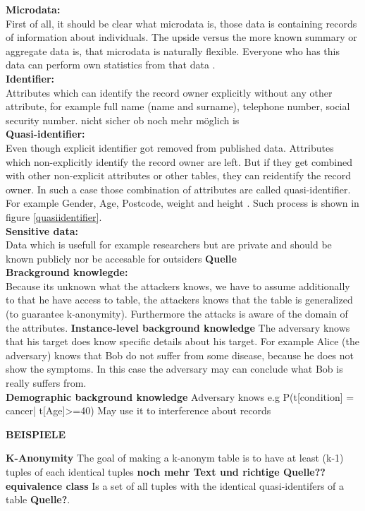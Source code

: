 \documentclass{llncs}
\begin{document}
\textbf{Microdata:}\\
First of all, it should be clear what microdata is, those data is containing records of information about individuals. The upside versus the more known summary or aggregate data is, that microdata is naturally flexible. Everyone who has this data can perform own statistics from that data \cite{microdataweb}.\\
\textbf{Identifier:}\\
Attributes which can identify the record owner explicitly without any other attribute, for example full name (name and surname), telephone number, social security number. nicht sicher ob noch mehr möglich is\cite{domingo2008critique}\\
\textbf{Quasi-identifier:}\\
Even though explicit identifier got removed from published data. Attributes which non-explicitly identify the record owner are left. But if they get combined with other non-explicit attributes or other tables, they can reidentify the record owner. In such a case those combination of attributes are called quasi-identifier. For example Gender, Age, Postcode, weight and height \cite{dalenius1986finding}. Such process is shown in figure \ref{quasiidentifier}.\\
\textbf{Sensitive data:}\\
Data which is usefull for example researchers but are private and should be known publicly nor be accesable for outsiders \textbf{Quelle}\\
\textbf{Brackground knowlegde:}\\
Because its unknown what the attackers knows, we have to assume additionally to that he have access to table, the attackers knows that the table is generalized (to guarantee k-anonymity). Furthermore the attacks is aware of the domain of the attributes. 
\textbf{Instance-level background knowledge}
The adversary knows that his target does know specific details about his target. For example Alice (the adversary) knows that Bob do not suffer from some disease, because he does not show the symptoms. In this case the adversary may can conclude what Bob is really suffers from.\\
\textbf{Demographic background knowledge}
Adversary knows e.g P(t[condition] = cancer| t[Age]>=40)
May use it to interference about records

\textbf{BEISPIELE}

\textbf{K-Anonymity}
The goal of making a k-anonym table is to have at least (k-1) tuples of each identical tuples \cite{sweeney2002k} \textbf{noch mehr Text und richtige Quelle??}
\textbf{equivalence class}
Is a set of all tuples with the identical quasi-identifers of a table \textbf{Quelle?}.
\end{document}
